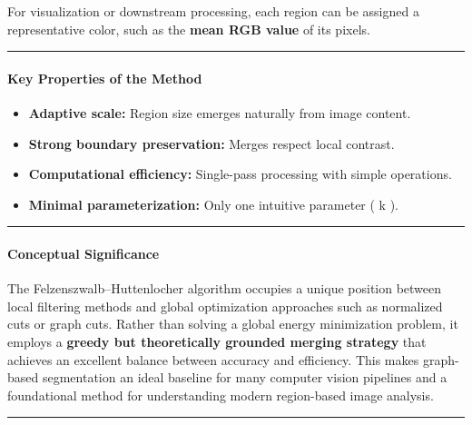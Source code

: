 \documentclass[11pt]{article}
\providecommand{\tightlist}{%
      \setlength{\itemsep}{0pt}\setlength{\parskip}{0pt}}
\begin{document}
For visualization or downstream processing, each region can be assigned
a representative color, such as the \textbf{mean RGB value} of its
pixels.

\begin{center}\rule{0.5\linewidth}{0.5pt}\end{center}

\hypertarget{key-properties-of-the-method}{%
\paragraph{\texorpdfstring{\textbf{Key Properties of the
Method}}{Key Properties of the Method}}\label{key-properties-of-the-method}}

\begin{itemize}
\tightlist
\item
  \textbf{Adaptive scale:} Region size emerges naturally from image
  content.
\item
  \textbf{Strong boundary preservation:} Merges respect local contrast.
\item
  \textbf{Computational efficiency:} Single-pass processing with simple
  operations.
\item
  \textbf{Minimal parameterization:} Only one intuitive parameter ( k ).
\end{itemize}

\begin{center}\rule{0.5\linewidth}{0.5pt}\end{center}

\hypertarget{conceptual-significance}{%
\paragraph{\texorpdfstring{\textbf{Conceptual
Significance}}{Conceptual Significance}}\label{conceptual-significance}}

The Felzenszwalb--Huttenlocher algorithm occupies a unique position
between local filtering methods and global optimization approaches such
as normalized cuts or graph cuts. Rather than solving a global energy
minimization problem, it employs a \textbf{greedy but theoretically
grounded merging strategy} that achieves an excellent balance between
accuracy and efficiency. This makes graph-based segmentation an ideal
baseline for many computer vision pipelines and a foundational method
for understanding modern region-based image analysis.

\begin{center}\rule{0.5\linewidth}{0.5pt}\end{center}
\end{document}
